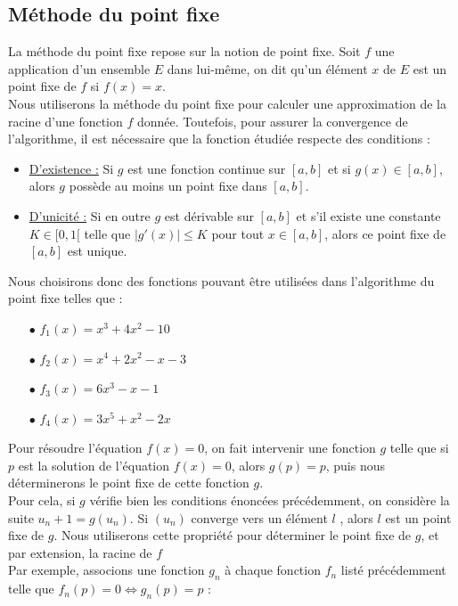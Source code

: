 \documentclass[12pt]{article}
\begin{document}
\subsection{Méthode du point fixe}
\label{ref:pt-fixe}
\noindent La méthode du point fixe repose sur la notion de point fixe. Soit $f$ une application d'un ensemble $E$ dans lui-même, on dit qu'un élément $x$ de $E$ est un point fixe de $f$ si $f(x) = x$.\\
Nous utiliserons la méthode du point fixe pour calculer une approximation de la racine d'une fonction $f$ donnée. Toutefois, pour assurer la convergence de l'algorithme, il est nécessaire que la fonction étudiée respecte des conditions :
\begin{itemize}
    \item \underline{D'existence :} Si $g$ est une fonction continue sur $[a,b]$ et si $g(x)\in[a,b]$, alors $g$ possède au moins un point fixe dans $[a,b]$.
    \item \underline{D'unicité :} Si en outre $g$ est dérivable sur $[a,b]$ et s'il existe une constante $K\in[0,1[$ telle que $|g'(x)|\leq K$ pour tout $x\in[a,b]$, alors ce point fixe de $[a,b]$ est unique.
\end{itemize}
Nous choisirons donc des fonctions pouvant être utilisées dans l'algorithme du point fixe telles que :
\begin{multicols}{2}
\begin{itemize}
    \item[$\bullet$] $f_1(x)=x^3+4x^2-10$
    \item[$\bullet$] $f_2(x)=x^4+2x^2-x-3$
    \item[$\bullet$] $f_3(x)=6x^3-x- 1$
    \item[$\bullet$] $f_4(x)=3x^5+x^2-2x$
\end{itemize}
\end{multicols}
\noindent Pour résoudre l'équation $f(x)=0$, on fait intervenir une fonction $g$ telle que si $p$ est la solution de l'équation $f(x)=0$, alors $g(p) = p$, puis nous déterminerons le point fixe de cette fonction $g$.\\
Pour cela, si $g$ vérifie bien les conditions énoncées précédemment, on considère la suite $u_n+1=g(u_n)$. Si $(u_n)$ converge vers un élément $l$ , alors $l$ est un point fixe de $g$. Nous utiliserons cette propriété pour déterminer le point fixe de $g$, et par extension, la racine de $f$\\
Par exemple, associons une fonction $g_n$ à chaque fonction $f_n$ listé précédemment telle que $f_n(p)=0 \iff g_n(p)=p$ :
\end{document}
